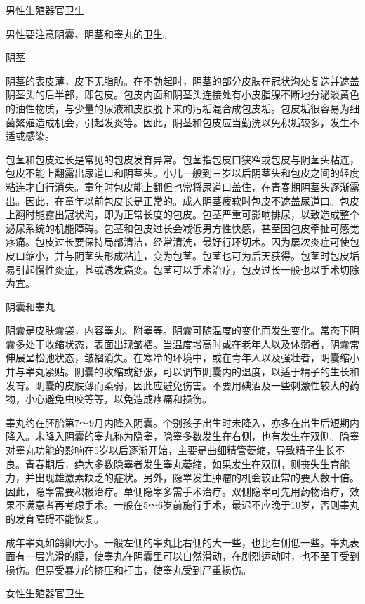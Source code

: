 \documentclass[12pt,UTF8,openany]{ctexbook}
\begin{document}
男性生殖器官卫生


男性要注意阴囊、阴茎和睾丸的卫生。

阴茎

阴茎的表皮薄，皮下无脂肪。在不勃起时，阴茎的部分皮肤在冠状沟处复迭并遮盖阴茎头的后半部，即包皮。包皮内面和阴茎头连接处有小皮脂腺不断地分泌淡黄色的油性物质，与少量的尿液和皮肤脱下来的污垢混合成包皮垢。包皮垢很容易为细菌繁殖造成机会，引起发炎等。因此，阴茎和包皮应当勤洗以免积垢较多，发生不适或感染。

包茎和包皮过长是常见的包皮发育异常。包茎指包皮口狭窄或包皮与阴茎头粘连，包皮不能上翻露出尿道口和阴茎头。小儿一般到三岁以后阴茎头和包皮之间的轻度粘连才自行消失。童年时包皮能上翻但也常将尿道口盖住，在青春期阴茎头逐渐露出。因此，在童年以前包皮长是正常的。成人阴茎疲软时包皮不遮盖尿道口。包皮上翻时能露出冠状沟，即为正常长度的包皮。包茎严重可影响排尿，以致造成整个泌尿系统的机能障碍。包茎和包皮过长会减低男方性快感，甚至因包皮牵扯可感觉疼痛。包皮过长要保持局部清洁，经常清洗，最好行环切术。因为屡次炎症可使包皮口缩小，并与阴茎头形成粘连，变为包茎。包茎也可为后天获得。包茎时包皮垢易引起慢性炎症，甚或诱发癌变。包茎可以手术治疗，包皮过长一般也以手术切除为宜。

阴囊和睾丸

阴囊是皮肤囊袋，内容睾丸、附睾等。阴囊可随温度的变化而发生变化。常态下阴囊多处于收缩状态，表面出现皱褶。当温度增高时或在老年人以及体弱者，阴囊常伸展呈松弛状态，皱褶消失。在寒冷的环境中，或在青年人以及强壮者，阴囊缩小并与睾丸紧贴。阴囊的收缩或舒张，可以调节阴囊内的温度，以适于精子的生长和发育。阴囊的皮肤薄而柔弱，因此应避免伤害。不要用碘酒及一些刺激性较大的药物，小心避免虫咬等等，以免造成疼痛和损伤。

睾丸约在胚胎第7～9月内降入阴囊。个别孩子出生时未降入，亦多在出生后短期内降入。未降入阴囊的睾丸称为隐睾，隐睾多数发生在右侧，也有发生在双侧。隐睾对睾丸功能的影响在5岁以后逐渐开始，主要是曲细精管萎缩，导致精子生长不良。青春期后，绝大多数隐睾者发生睾丸萎缩，如果发生在双侧，则丧失生育能力，并出现雄激素缺乏的症状。另外，隐睾发生肿瘤的机会较正常的要大数十倍。因此，隐睾需要积极治疗。单侧隐睾多需手术治疗。双侧隐睾可先用药物治疗，效果不满意者再考虑手术。一般在5～6岁前施行手术，最迟不应晚于10岁，否则睾丸的发育障碍不能恢复。

成年睾丸如鸽卵大小。一般左侧的睾丸比右侧的大一些，也比右侧低一些。睾丸表面有一层光滑的膜，使睾丸在阴囊里可以自然滑动，在剧烈运动时，也不至于受到损伤。但易受暴力的挤压和打击，使睾丸受到严重损伤。





女性生殖器官卫生
\end{document}
